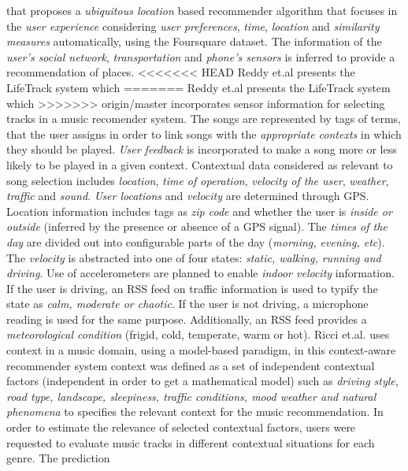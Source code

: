 that proposes a \textit{ubiquitous location­} based recommender algorithm
that focuses in the \textit{user experience} considering 
\textit{user preferences}, \textit{time}, \textit{location} and 
\textit{similarity measures} automatically, using the Foursquare
dataset. The information of the \textit{user's social network},
\textit{transportation} and \textit{phone's sensors} is inferred to provide
a recommendation of places.
<<<<<<< HEAD
Reddy et.al \cite{reddy2006lifetrak} presents the LifeTrack system which 
=======
Reddy et.al\cite{reddy2006lifetrak} presents the LifeTrack system which 
>>>>>>> origin/master
incorporates sensor information for selecting tracks in a music recomender system.
The songs are represented by tags of terms, that the user assigns in order to link
songs with the \textit{appropriate contexts} in which they should be played.
\textit{User feedback} is incorporated to make a song more or less likely to be
played in a given context. Contextual data considered as relevant to song selection
includes \textit{location}, \textit{time of operation}, \textit{velocity of the user}, 
\textit{weather}, \textit{traffic} and \textit{sound}. \textit{User locations} and 
\textit{velocity} are determined through GPS.
Location information includes tags as \textit{zip code} and whether the
user is \textit{inside or outside} (inferred by the presence or absence of a
GPS signal). The \textit{times of the day} are divided out into configurable
parts of the day (\textit{morning, evening, etc}). The \textit{velocity} is 
abstracted into one of four states: \textit{static, walking, running and driving}.  
Use of accelerometers are planned to enable \textit{indoor velocity}
information. If the user is driving, an RSS feed on traffic information 
is used to typify the state as \textit{calm, moderate or chaotic}. If the user is not
driving, a microphone reading is used for the same purpose.
Additionally, an RSS feed provides a \textit{meteorological condition} (frigid,
cold, temperate, warm or hot).
Ricci et.al. \cite{baltrunas2011incarmusic} uses
context in a music domain, using a model-based paradigm, in this
context-aware recommender system context was defined as a set of
independent contextual factors (independent in order to get a
mathematical model) such as \textit{driving style, road type,
landscape, sleepiness, traffic conditions, mood weather and natural
phenomena} to specifies the relevant context for the music
recommendation. In order to estimate the relevance of selected
contextual factors, users were requested to evaluate music tracks
in different contextual situations for each genre. The prediction
